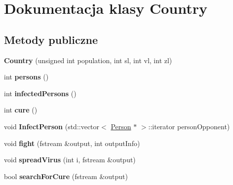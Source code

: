 \hypertarget{classCountry}{}\section{Dokumentacja klasy Country}
\label{classCountry}
\subsection*{Metody publiczne}
\begin{DoxyCompactItemize}
\item 
{\bfseries Country} (unsigned int population, int sl, int vl, int zl)\hypertarget{classCountry_afc0bccd7503b1878f47d816aad1be547}{}\label{classCountry_afc0bccd7503b1878f47d816aad1be547}

\item 
int {\bfseries persons} ()\hypertarget{classCountry_ab1dd10f4a0d9d1cf53fb8a9f4079de93}{}\label{classCountry_ab1dd10f4a0d9d1cf53fb8a9f4079de93}

\item 
int {\bfseries infected\+Persons} ()\hypertarget{classCountry_a3b8ee891f42aed5f438e564df7bf3b0a}{}\label{classCountry_a3b8ee891f42aed5f438e564df7bf3b0a}

\item 
int {\bfseries cure} ()\hypertarget{classCountry_a464c5b103990dfab70b50217edb60876}{}\label{classCountry_a464c5b103990dfab70b50217edb60876}

\item 
void {\bfseries Infect\+Person} (std\+::vector$<$ \hyperlink{classPerson}{Person} $\ast$ $>$\+::iterator person\+Opponent)\hypertarget{classCountry_a5c46c5155c99175ffb3acef946312be0}{}\label{classCountry_a5c46c5155c99175ffb3acef946312be0}

\item 
void {\bfseries fight} (fstream \&output, int output\+Info)\hypertarget{classCountry_ae7333fae8f953c2f39da1a46c3d3862a}{}\label{classCountry_ae7333fae8f953c2f39da1a46c3d3862a}

\item 
void {\bfseries spread\+Virus} (int i, fstream \&output)\hypertarget{classCountry_aa8fe23fc3002c75b93946cae54c4f202}{}\label{classCountry_aa8fe23fc3002c75b93946cae54c4f202}

\item 
bool {\bfseries search\+For\+Cure} (fstream \&output)\hypertarget{classCountry_aceb291a044a495483951745eecece744}{}\label{classCountry_aceb291a044a495483951745eecece744}


\end{DoxyCompactItemize}
